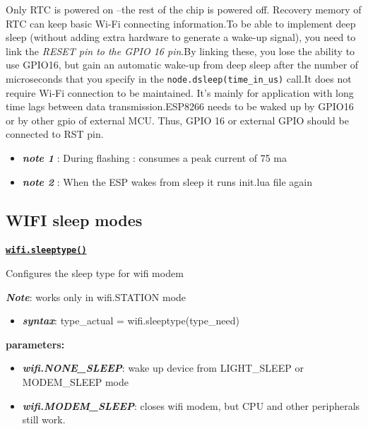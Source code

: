 \documentclass[16pt]{article}
\begin{document}
Only RTC is powered on --the rest of the chip is powered off. Recovery
memory of RTC can keep basic Wi-Fi connecting information.To be able to implement deep sleep (without adding extra hardware to
generate a wake-up signal), you need to link the \emph{RESET pin to the
GPIO 16 pin}.By linking these, you lose the ability to use GPIO16, but
gain an automatic wake-up from deep sleep after the number of
microseconds that you specify in the \texttt{node.dsleep(time\_in\_us)}
call.It does not require Wi-Fi connection to be maintained. It's mainly for
application with long time lags between data transmission.ESP8266 needs to be waked up by GPIO16 or by other gpio of external MCU.
Thus, GPIO 16 or external GPIO should be connected to RST pin.

\begin{itemize}

\item
  \textbf{\emph{note 1}} : During flashing : consumes a peak current of 75
  ma
\item
  \textbf{\emph{note 2}} : When the ESP wakes from sleep it runs init.lua file again
\end{itemize}

\vspace{0.5cm}
\subsection{WIFI sleep modes}

\vspace{0.5cm}
{\underline{\texttt{\textbf{wifi.sleeptype()}}}}


\vspace{0.1cm}
  Configures the sleep type for wifi modem


\textbf{\emph{Note}}: works only in wifi.STATION mode

\begin{itemize}

\item
  \textbf{\emph{syntax}}: type\_actual = wifi.sleeptype(type\_need)
\end{itemize}

  \textbf{parameters:}

\begin{itemize}
\item
  \textbf{\emph{wifi.NONE\_SLEEP}}: wake up device from LIGHT\_SLEEP or MODEM\_SLEEP
  mode
\item
  \textbf{\emph{wifi.MODEM\_SLEEP}}: closes wifi modem, but CPU and other peripherals
  still work.
\end{itemize}
\end{document}
